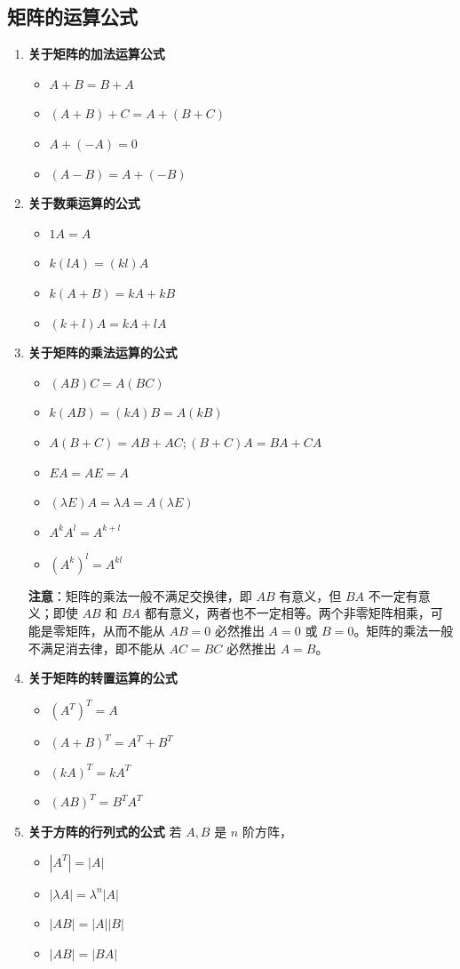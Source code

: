 \documentclass[UTF8]{ctexart}
\theoremstyle{mydef}
\begin{document}
\subsection{矩阵的运算公式}
\begin{enumerate}
    \item \textbf{关于矩阵的加法运算公式}
    \begin{itemize}
        \item $A + B = B + A$
        \item $(A + B) + C = A + (B + C)$
        \item $A + (-A) = 0$
        \item $(A - B) = A + (-B)$
    \end{itemize}
    \item \textbf{关于数乘运算的公式}
    \begin{itemize}
        \item $1 A = A$
        \item $k(lA) = (kl)A$
        \item $k(A + B) = kA + kB$
        \item $(k + l)A = kA + lA$
    \end{itemize}
    \item \textbf{关于矩阵的乘法运算的公式}
    \begin{itemize}
        \item $(AB)C = A(BC)$
        \item $k(AB) = (kA)B = A(kB)$
        \item $A(B + C) = AB + AC; (B + C)A = BA + CA$
        \item $EA = AE = A$
        \item $(\lambda E)A = \lambda A = A(\lambda E)$
        \item $A^k A^l = A^{k+l}$
        \item $(A^k)^l = A^{kl}$
    \end{itemize}
    \textbf{注意}：矩阵的乘法一般不满足交换律，即 $AB$ 有意义，但 $BA$ 不一定有意义；即使 $AB$ 和 $BA$ 都有意义，两者也不一定相等。两个非零矩阵相乘，可能是零矩阵，从而不能从 $AB=0$ 必然推出 $A=0$ 或 $B=0$。矩阵的乘法一般不满足消去律，即不能从 $AC=BC$ 必然推出 $A=B$。
    \item \textbf{关于矩阵的转置运算的公式}
    \begin{itemize}
        \item $(A^T)^T = A$
        \item $(A + B)^T = A^T + B^T$
        \item $(kA)^T = k A^T$
        \item $(AB)^T = B^T A^T$
    \end{itemize}
    \item \textbf{关于方阵的行列式的公式}
    若 $A, B$ 是 $n$ 阶方阵，
    \begin{itemize}
        \item $|A^T| = |A|$
        \item $|\lambda A| = \lambda^n |A|$
        \item $|AB| = |A||B|$
        \item $|AB| = |BA|$
    \end{itemize}
\end{enumerate}
\end{document}
